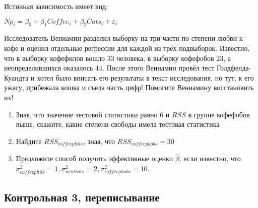 \begin{enumerate}
Истинная зависимость имеет вид:

\( Np_i = \beta_0 + \beta_1 Coffee_i + \beta_2 Cats_i + \varepsilon_i \)

Исследователь Вениамин разделил выборку на три части по степени любви к кофе 
и оценил отдельные регрессии для каждой из трёх подвыборок. 
Известно, что в выборку кофефилов вошло 33 человека, в выборку кофефобов 23, 
а неопределившихся оказалось 44. После этого Вениамин провёл 
тест Голдфелда-Куандта и хотел было вписать его результаты в текст исследования, 
но тут, к его ужасу, прибежала кошка и съела часть цифр! Помогите Вениамину восстановить их!

\begin{enumerate}
\item Зная, что значение тестовой статистики равно 6 и \( RSS \) в группе кофефобов выше, скажите, какие степени свободы имела тестовая статистика 
\item Найдите \( RSS_{coffeephils} \), зная, что \( RSS_{coffeephobs} = 30 \)
\item Предложите способ получить эффективные оценки \( \hat{\beta} \), если известно, что \( \sigma^2_{coffeephils}=1, \sigma^2_{neutrals}=2, \sigma^2_{coffeephobs}=10 \). 
\end{enumerate}



\end{enumerate}


\subsection{Контрольная 3, переписывание}


